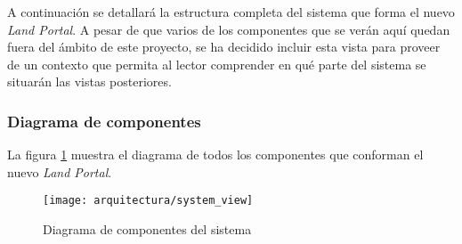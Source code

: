 A continuación se detallará la estructura completa del sistema que forma el nuevo \textit{Land Portal}.  A pesar de que varios de los componentes que se verán aquí quedan fuera del ámbito de este proyecto, se ha decidido incluir esta vista para proveer de un contexto que permita al lector comprender en qué parte del sistema se situarán las vistas posteriores.

\subsubsection{Diagrama de componentes}
La figura \ref{fig:diagrama_componentes_sistema} muestra el diagrama de todos los componentes que conforman el nuevo \textit{Land Portal}.
\begin{landscape}
	\begin{figure}[ht]
		\centering
		\texttt{[image: arquitectura/system\_view]}
		\caption{Diagrama de componentes del sistema}
		\label{fig:diagrama_componentes_sistema}
	\end{figure}
\end{landscape}


